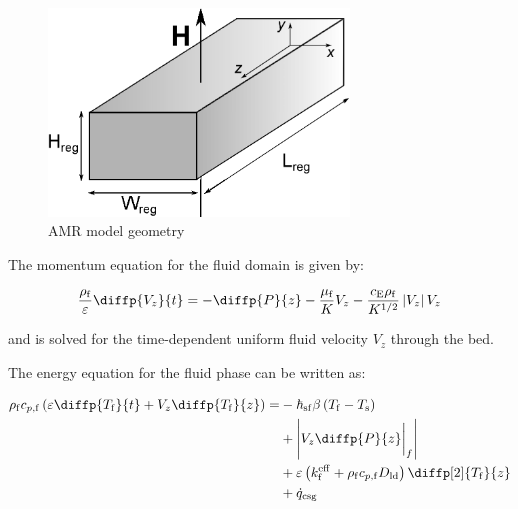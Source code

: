 \documentclass[referee]{svjour3}
\begin{document}

\begin{figure}[!ht]
  \centering
  \includegraphics[width=8cm]{reg3d}
  \caption{AMR model geometry}
  \label{fig:amrmodel}
\end{figure}

The momentum equation for the fluid domain is given by:

\begin{equation}
\label{eq:75}
  \frac{\rho\ped{f}}{\varepsilon} \diffp{V_z}{t}= -\diffp{P}{z} - \frac{\mu\ped{f}}{K} V_z - \frac{c\ped{E} \rho\ped{f}}{K^{1/2}} \left| V_z\right| V_z 
\end{equation}



\noindent and is solved for the time-dependent uniform fluid velocity $V_z$ through the bed. 

The energy equation for the fluid phase can be written as:

\begin{equation}
\label{eq:78}
\begin{split}
  \rho\ped{f} c_{p,\mathrm{f}} \left(\varepsilon \diffp{T\ped{f}}{t} + V_z\diffp{T\ped{f}}{z}\right) = & -\hheat\ped{sf} \beta \left(T\ped{f} - T\ped{s}\right) \\
& + \left|V_z\diffp{P}{z}\bigg|_f \right| \\
& + \varepsilon\left(k\ped{f}\ap{eff}  +\rho\ped{f} c_{p,\mathrm{f}} D\ped{ld}\right)\diffp[2]{T\ped{f}}{z} \\
& + \rate{q}\ped{csg}  
\end{split}
\end{equation}
\end{document}
